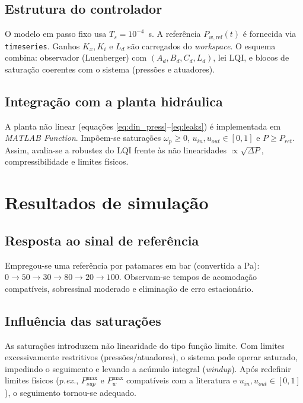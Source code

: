 \subsection{Estrutura do controlador}
\label{sec:estrutura-controlador-simulink}

O modelo em passo fixo usa $T_s=10^{-4}$~s. A referência $P_{w,\text{ref}}(t)$ é fornecida via \texttt{timeseries}. Ganhos $K_x,K_i$ e $L_d$ são carregados do \emph{workspace}. O esquema combina: observador (Luenberger) com $(A_d,B_d,C_d,L_d)$, lei LQI, e blocos de saturação coerentes com o sistema (pressões e atuadores).

\subsection{Integração com a planta hidráulica}
\label{sec:integracao-planta-hidraulica}

A planta não linear (equações \eqref{eq:din_press}–\eqref{eq:leaks}) é implementada em \emph{MATLAB Function}. Impõem-se saturações $\omega_p\ge 0$, $u_{in},u_{out}\in[0,1]$ e $P\ge P_{ret}$. Assim, avalia-se a robustez do LQI frente às não linearidades $\propto \sqrt{\Delta P}$, compressibilidade e limites físicos.

\section{Resultados de simulação}
\label{sec:resultados-simulacao}

\subsection{Resposta ao sinal de referência}
\label{sec:resposta-sinal-referencia}

Empregou-se uma referência por patamares em bar (convertida a Pa): $0\rightarrow 50\rightarrow 30\rightarrow 80\rightarrow 20\rightarrow 100$. Observam-se tempos de acomodação compatíveis, sobressinal moderado e eliminação de erro estacionário.

\subsection{Influência das saturações}
\label{sec:influencia-saturacoes}

As saturações introduzem não linearidade do tipo função limite. Com limites excessivamente restritivos (pressões/atuadores), o sistema pode operar saturado, impedindo o seguimento e levando a acúmulo integral (\emph{windup}). Após redefinir limites físicos (\emph{p.ex.}, $P_{sup}^{\max}$ e $P_{w}^{\max}$ compatíveis com a literatura e $u_{in},u_{out}\in[0,1]$), o seguimento tornou-se adequado.

